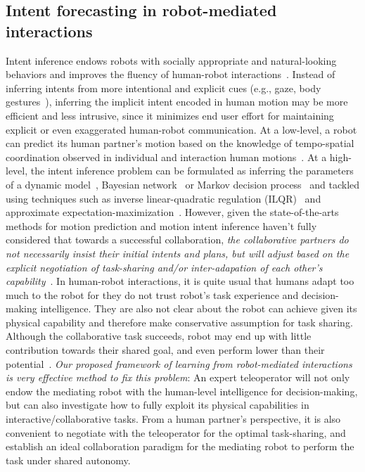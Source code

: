 \documentclass[letterpaper, 11 pt, onecolumn]{article}
\begin{document}
\subsection{Intent forecasting in robot-mediated interactions}\label{sec:related-learning}

Intent inference endows robots with socially appropriate and natural-looking behaviors and improves the fluency of human-robot interactions~\cite{calinon2009learning,strabala2013towards}. Instead of inferring intents from more intentional and explicit cues (e.g., gaze, body gestures~\cite{huang2016anticipatory}), inferring the implicit intent encoded in human motion may be more efficient and less intrusive, since it minimizes end user effort for maintaining explicit or even exaggerated human-robot communication. At a low-level, a robot can predict its human partner's motion based on the knowledge of tempo-spatial coordination observed in individual and interaction human motions~\cite{Hogan_Flash:85, sisbot2012human,huber2010assist, glasauer2010interacting, strabala2013towards, li2015rssworkshop, perez2015fast,maeda2017phase}. At a high-level, the intent inference problem can be formulated as inferring the parameters of a dynamic model~\cite{wang2013probabilistic}, Bayesian network~\cite{liu2016fuzzy} or Markov decision process~\cite{mcghan2015human} and tackled using techniques such as inverse linear-quadratic regulation (ILQR)~\cite{monfort2015intent} and approximate expectation-maximization~\cite{ravichandar2017human}. However, given the state-of-the-arts methods for motion prediction and motion intent inference haven't fully considered that towards a successful collaboration, \textit{the collaborative partners do not necessarily insist their initial intents and plans, but will adjust based on the explicit negotiation of task-sharing and/or inter-adapation of each other's capability}~\cite{nikolaidis2017human}. In human-robot interactions, it is quite usual that humans adapt too much to the robot for they do not trust robot's task experience and decision-making intelligence. They are also not clear about the robot can achieve given its physical capability and therefore make conservative assumption for task sharing. Although the collaborative task succeeds, robot may end up with little contribution towards their shared goal, and even perform lower than their potential~\cite{hancock2011meta,lee2013computationally,salem2015would}. \textit{Our proposed framework of learning from robot-mediated interactions is very effective method to fix this problem}: An expert teleoperator will not only endow the mediating robot with the human-level intelligence for decision-making, but can also investigate how to fully exploit its physical capabilities in interactive/collaborative tasks. From a human partner's perspective, it is also convenient to negotiate with the teleoperator for the optimal task-sharing, and establish an ideal collaboration paradigm for the mediating robot to perform the task under shared autonomy.  
\end{document}
